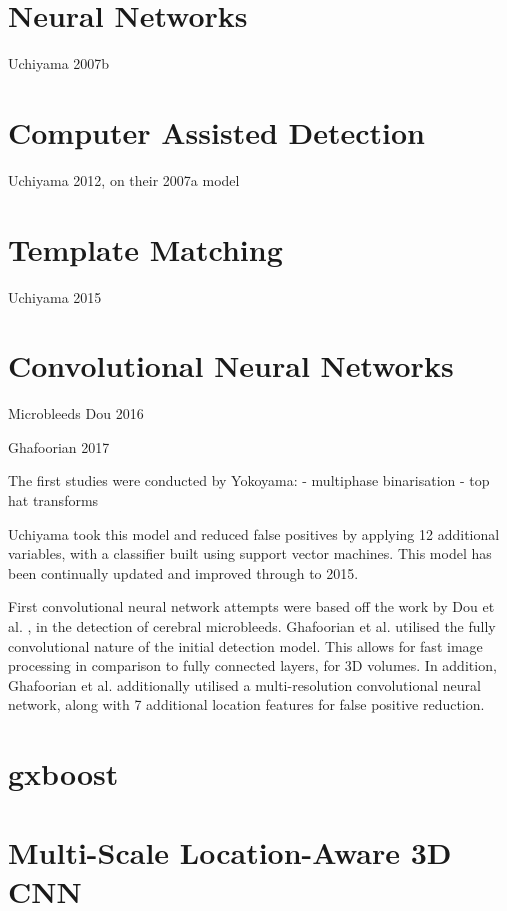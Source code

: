 \section{Neural Networks}

Uchiyama 2007b

\section{Computer Assisted Detection}

Uchiyama 2012, on their 2007a model

\section{Template Matching}

Uchiyama 2015

\section{Convolutional Neural Networks}

Microbleeds Dou 2016

Ghafoorian 2017

The first studies were conducted by Yokoyama:
 - multiphase binarisation
 - top hat transforms
 
 Uchiyama took this model and reduced false positives by applying 12 additional variables, with a classifier built using support vector machines. This model has been continually updated and improved through to 2015. 
 
First convolutional neural network attempts were based off the work by Dou et al. \cite{DouQ.2016ADoC}, in the detection of cerebral microbleeds. Ghafoorian et al. \cite{GhafoorianM.2017Dml3} utilised the fully convolutional nature of the initial detection model. This allows for fast image processing in comparison to fully connected layers, for 3D volumes. In addition, Ghafoorian et al. additionally utilised a multi-resolution convolutional neural network, along with 7 additional location features for false positive reduction.

\section{gxboost}


\section{Multi-Scale Location-Aware 3D CNN}\label{litrev-ghafoorian}

